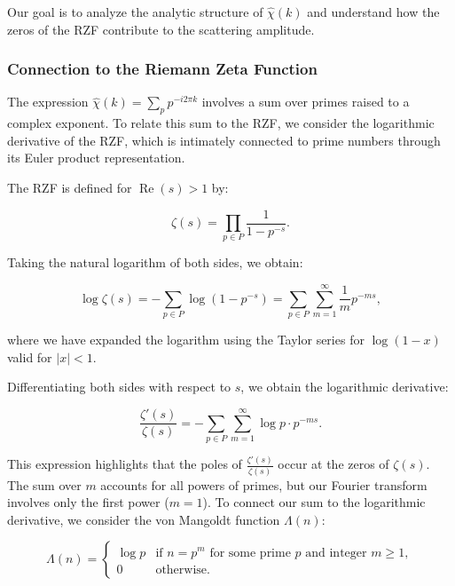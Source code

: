 \documentclass[11pt, oneside]{article}
\begin{document}
Our goal is to analyze the analytic structure of $\hat{\chi}(k)$ and understand how the zeros of the RZF contribute to the scattering amplitude.

\subsubsection{Connection to the Riemann Zeta Function}

The expression $\hat{\chi}(k) = \sum_{p} p^{-i 2\pi k}$ involves a sum over primes raised to a complex exponent. To relate this sum to the RZF, we consider the logarithmic derivative of the RZF, which is intimately connected to prime numbers through its Euler product representation.

The RZF is defined for $\operatorname{Re}(s) > 1$ by:

\begin{equation}
\zeta(s) = \prod_{p \in P} \frac{1}{1 - p^{-s}}.
\end{equation}

Taking the natural logarithm of both sides, we obtain:

\begin{equation}
\log \zeta(s) = -\sum_{p \in P} \log\left(1 - p^{-s}\right) = \sum_{p \in P} \sum_{m=1}^\infty \frac{1}{m} p^{-m s},
\end{equation}

where we have expanded the logarithm using the Taylor series for $\log(1 - x)$ valid for $|x| < 1$.

Differentiating both sides with respect to $s$, we obtain the logarithmic derivative:

\begin{equation}
\frac{\zeta'(s)}{\zeta(s)} = -\sum_{p \in P} \sum_{m=1}^\infty \log p \cdot p^{-m s}.
\end{equation}

This expression highlights that the poles of $\frac{\zeta'(s)}{\zeta(s)}$ occur at the zeros of $\zeta(s)$. The sum over $m$ accounts for all powers of primes, but our Fourier transform involves only the first power ($m = 1$). To connect our sum to the logarithmic derivative, we consider the von Mangoldt function $\Lambda(n)$:

\begin{equation}
\Lambda(n) = \begin{cases}
\log p & \text{if } n = p^m \text{ for some prime } p \text{ and integer } m \geq 1, \\
0 & \text{otherwise}.
\end{cases}
\end{equation}
\end{document}
